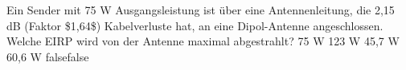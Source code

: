     {Ein Sender mit 75 W Ausgangsleistung ist über eine Antennenleitung, die 2,15 dB (Faktor \$1,64\$) Kabelverluste hat, an eine Dipol-Antenne angeschlossen. Welche EIRP wird von der Antenne maximal abgestrahlt?}
    {75 W}
    {123 W}
    {45,7 W}
    {60,6 W}
    {false}{false}